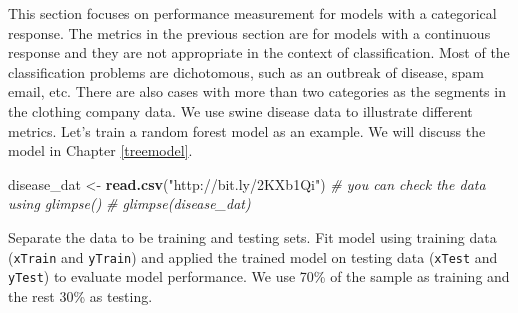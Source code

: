 \documentclass[12pt,]{krantz}
\makeatletter
\newenvironment{Shaded}{\begin{snugshade}}{\end{snugshade}}
\newcommand{\CommentTok}[1]{\textcolor[rgb]{0.37,0.37,0.37}{\textit{#1}}}
\newcommand{\DataTypeTok}[1]{\textcolor[rgb]{0.27,0.27,0.27}{#1}}
\newcommand{\DecValTok}[1]{\textcolor[rgb]{0.06,0.06,0.06}{#1}}
\newcommand{\FloatTok}[1]{\textcolor[rgb]{0.06,0.06,0.06}{#1}}
\newcommand{\KeywordTok}[1]{\textcolor[rgb]{0.27,0.27,0.27}{\textbf{#1}}}
\newcommand{\NormalTok}[1]{#1}
\newcommand{\OperatorTok}[1]{\textcolor[rgb]{0.43,0.43,0.43}{\textbf{#1}}}
\newcommand{\StringTok}[1]{\textcolor[rgb]{0.5,0.5,0.5}{#1}}
\newenvironment{kframe}{%
\medskip{}
\setlength{\fboxsep}{.8em}
 \def\at@end@of@kframe{}%
 \ifinner\ifhmode%
  \def\at@end@of@kframe{\end{minipage}}%
  \begin{minipage}{\columnwidth}%
 \fi\fi%
 \def\FrameCommand##1{\hskip\@totalleftmargin \hskip-\fboxsep
 \colorbox{shadecolor}{##1}\hskip-\fboxsep
     \hskip-\linewidth \hskip-\@totalleftmargin \hskip\columnwidth}%
 \MakeFramed {\advance\hsize-\width
   \@totalleftmargin\z@ \linewidth\hsize
   \@setminipage}}%
 {\par\unskip\endMakeFramed%
 \at@end@of@kframe}
\renewenvironment{Shaded}{\begin{kframe}}{\end{kframe}}
\makeatother
\begin{document}
This section focuses on performance measurement for models with a categorical response. The metrics in the previous section are for models with a continuous response and they are not appropriate in the context of classification. Most of the classification problems are dichotomous, such as an outbreak of disease, spam email, etc. There are also cases with more than two categories as the segments in the clothing company data. We use swine disease data to illustrate different metrics. Let's train a random forest model as an example. We will discuss the model in Chapter \ref{treemodel}.

\begin{Shaded}
\begin{Highlighting}[]
\NormalTok{disease_dat <-}\StringTok{ }\KeywordTok{read.csv}\NormalTok{(}\StringTok{"http://bit.ly/2KXb1Qi"}\NormalTok{)}
\CommentTok{# you can check the data using glimpse()}
\CommentTok{# glimpse(disease_dat)}
\end{Highlighting}
\end{Shaded}

Separate the data to be training and testing sets. Fit model using training data (\texttt{xTrain} and \texttt{yTrain}) and applied the trained model on testing data (\texttt{xTest} and \texttt{yTest}) to evaluate model performance. We use 70\% of the sample as training and the rest 30\% as testing.

\begin{Shaded}
\end{Shaded}
\end{document}
